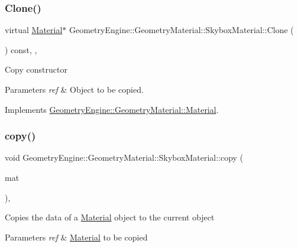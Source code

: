 \subsubsection{\texorpdfstring{Clone()}{Clone()}}
{\footnotesize\ttfamily virtual \mbox{\hyperlink{class_geometry_engine_1_1_geometry_material_1_1_material}{Material}}$\ast$ Geometry\+Engine\+::\+Geometry\+Material\+::\+Skybox\+Material\+::\+Clone (\begin{DoxyParamCaption}{ }\end{DoxyParamCaption}) const\hspace{0.3cm}{\ttfamily [inline]}, {\ttfamily [override]}, {\ttfamily [virtual]}}

Copy constructor 
\begin{DoxyParams}{Parameters}
{\em ref} & Object to be copied. \\
\hline
\end{DoxyParams}


Implements \mbox{\hyperlink{class_geometry_engine_1_1_geometry_material_1_1_material_ae5513ff06d536365e18ddc5e07e79784}{Geometry\+Engine\+::\+Geometry\+Material\+::\+Material}}.

\mbox{\label{class_geometry_engine_1_1_geometry_material_1_1_skybox_material_afcb8bf256fbb2927e2030fbe8a631af0}} 
\subsubsection{\texorpdfstring{copy()}{copy()}}
{\footnotesize\ttfamily void Geometry\+Engine\+::\+Geometry\+Material\+::\+Skybox\+Material\+::copy (\begin{DoxyParamCaption}\item[{const \mbox{\hyperlink{class_geometry_engine_1_1_geometry_material_1_1_skybox_material}{Skybox\+Material}} \&}]{mat }\end{DoxyParamCaption})\hspace{0.3cm}{\ttfamily [protected]}, {\ttfamily [virtual]}}

Copies the data of a \mbox{\hyperlink{class_geometry_engine_1_1_geometry_material_1_1_material}{Material}} object to the current object 
\begin{DoxyParams}{Parameters}
{\em ref} & \mbox{\hyperlink{class_geometry_engine_1_1_geometry_material_1_1_material}{Material}} to be copied \\
\hline
\end{DoxyParams}
\mbox{\label{class_geometry_engine_1_1_geometry_material_1_1_skybox_material_a0cc520b905996a178c80a2657bc9746f}} 
